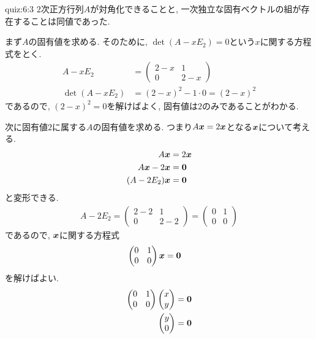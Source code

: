 \begin{answerof}{quiz:6:3}
  $2$次正方行列$A$が対角化できることと,
  一次独立な固有ベクトルの組が存在することは同値であった.

  まず$A$の固有値を求める.
  そのために, $\det(A-xE_2)=0$という$x$に関する方程式をとく.
  \begin{align*}
    A-xE_2&=\begin{pmatrix}2-x&1\\0&2-x\end{pmatrix}\\
    \det(A-xE_2)&=(2-x)^2-1\cdot 0=(2-x)^2
  \end{align*}
  であるので, $(2-x)^2=0$を解けばよく,
  固有値は$2$のみであることがわかる.

  次に固有値$2$に属する$A$の固有値を求める.
  つまり$A\boldsymbol{x}=2\boldsymbol{x}$となる$\boldsymbol{x}$について考える.
  \begin{align*}
    A\boldsymbol{x}&=2\boldsymbol{x}\\
    A\boldsymbol{x}-2\boldsymbol{x}&=\boldsymbol{0} \\
    (A-2E_2)\boldsymbol{x}&=\boldsymbol{0}
  \end{align*}
  と変形できる.
  \begin{align*}
    A-2E_2=\begin{pmatrix}2-2&1\\0&2-2\end{pmatrix}
    =\begin{pmatrix}0&1\\0&0\end{pmatrix}
  \end{align*}
  であるので, $\boldsymbol{x}$に関する方程式
  \begin{align*}
    \begin{pmatrix}0&1\\0&0\end{pmatrix}\boldsymbol{x}&=\boldsymbol{0}
  \end{align*}
  を解けばよい.
  \begin{align*}
    \begin{pmatrix}0&1\\0&0\end{pmatrix}
      \begin{pmatrix}x\\y\end{pmatrix}
      &=\boldsymbol{0}\\
      \begin{pmatrix}y\\0\end{pmatrix}
      &=\boldsymbol{0}\\
  \end{align*}

\end{answerof}

